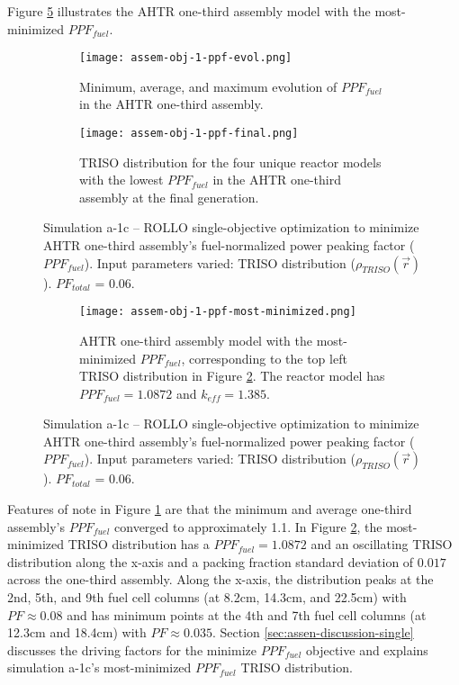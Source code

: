 Figure \ref{fig:assem-obj-1-ppf-most-minimized} illustrates the \gls{AHTR} one-third 
assembly model with the most-minimized $PPF_{fuel}$. 
\begin{figure}[htbp!]
    \begin{subfigure}{\textwidth}
        \centering
        \texttt{[image: assem-obj-1-ppf-evol.png]}
        \caption{Minimum, average, and maximum evolution of $PPF_{fuel}$ in the 
        AHTR one-third assembly.}
        \label{fig:assem-obj-1-ppf-evol} 
    \end{subfigure}
    \begin{subfigure}{\textwidth}
        \centering
        \texttt{[image: assem-obj-1-ppf-final.png]}
        \caption{TRISO distribution for the four unique reactor models with the 
        lowest $PPF_{fuel}$ in the AHTR one-third assembly at the final generation.}
        \label{fig:assem-obj-1-ppf-final} 
    \end{subfigure}
    \caption{Simulation a-1c -- ROLLO single-objective optimization to minimize 
    AHTR one-third assembly's fuel-normalized power peaking factor ($PPF_{fuel}$). 
    Input parameters varied: TRISO distribution ($\rho_{TRISO}(\vec{r})$).
    $PF_{total}$ = 0.06.}
    \label{fig:assem-obj-1-ppf}
\end{figure}
\begin{figure}[htbp!]
    \ContinuedFloat
    \begin{subfigure}{\textwidth}
        \centering
        \texttt{[image: assem-obj-1-ppf-most-minimized.png]}
        \caption{\gls{AHTR} one-third assembly model with the most-minimized 
        $PPF_{fuel}$, corresponding to the top left TRISO distribution in Figure 
        \ref{fig:assem-obj-1-ppf-final}. The reactor model has $PPF_{fuel}=1.0872$
        and $k_{eff}=1.385$.}
        \label{fig:assem-obj-1-ppf-most-minimized} 
    \end{subfigure}
    \caption{Simulation a-1c -- ROLLO single-objective optimization to minimize 
    AHTR one-third assembly's fuel-normalized power peaking factor ($PPF_{fuel}$). 
    Input parameters varied: TRISO distribution ($\rho_{TRISO}(\vec{r})$).
    $PF_{total}$ = 0.06.}
\end{figure}

Features of note in Figure \ref{fig:assem-obj-1-ppf-evol} are that the minimum and 
average one-third assembly's $PPF_{fuel}$ converged to approximately 1.1.
In Figure \ref{fig:assem-obj-1-ppf-final}, the most-minimized TRISO distribution has 
a $PPF_{fuel} = 1.0872$ and an oscillating TRISO distribution along the x-axis and a 
packing fraction standard deviation of $0.017$ across the one-third assembly. 
Along the x-axis, the distribution peaks at the 2nd, 5th, and 9th fuel 
cell columns (at 8.2cm, 14.3cm, and 22.5cm) with $PF\approx0.08$ and has minimum points
at the 4th and 7th fuel cell columns (at 12.3cm and 18.4cm) with $PF\approx0.035$. 
Section \ref{sec:assen-discussion-single} discusses the driving factors for the minimize 
$PPF_{fuel}$ objective and explains simulation a-1c's most-minimized $PPF_{fuel}$ 
TRISO distribution. 

